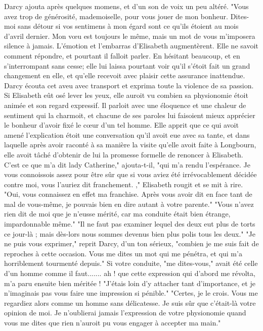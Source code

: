 Darcy ajouta après quelques momens, et d'un son de voix un peu altéré. "Vous avez trop de générosité, mademoiselle, pour vous jouer de mon bonheur. Dites-moi sans détour si vos sentimens à mon égard sont ce qu'ils étoient au mois d'avril dernier. Mon vœu est toujours le même, mais un mot\setcounter{page}{263} de vous m'imposera silence à jamais. L'émotion et l'embarras d'Elisabeth augmentèrent. Elle ne savoit comment répondre, et pourtant il falloit parler. En hésitant beaucoup, et en s'interrompant sans cesse; elle lui laissa pourtant voir qu'il s'étoit fait un grand changement en elle, et qu'elle recevoit avec plaisir cette assurance inattendue.
Darcy écouta cet aveu avec transport et exprima toute la violence de sa passion. Si Elisabeth eût osé lever les yeux, elle auroit vu combien sa physionomie étoit animée et son regard expressif. Il parloit avec une éloquence et une chaleur de sentiment qui la charmoit, et chacune de ses paroles lui faisoient mieux apprécier le bonheur d'avoir fixé le cœur d'un tel homme.
Elle apprit que ce qui avoit amené l'explication étoit une conversation qu'il avoit eue avec sa tante, et dans laquelle après avoir raconté à sa manière la visite qu'elle avoit faite à Longbourn, elle avoit tâché d'obtenir de lui la promesse formelle de renoncer à Elisabeth. C'est ce que m'a dit lady Catherine," ajouta-t-il, "qui m'a rendu l'espérance. Je vous connoissois assez pour être sûr que si vous aviez été irrévocablement décidée contre moi, vous l'auriez dit franchement. ,"
\setcounter{page}{264}
Elisabeth rougit et se mit à rire. "Oui, vous connaissez en effet ma franchise. Après vous avoir dit en face tant de mal de vous-même, je pouvais bien en dire autant à votre parente."
"Vous n'avez rien dit de moi que je n'eusse mérité, car ma conduite était bien étrange, impardonnable même."
"Il ne faut pas examiner lequel des deux eut plus de torts ce jour-là ; mais dès-lors nous sommes devenus bien plus polis tous les deux."
"Je ne puis vous exprimer," reprit Darcy, d'un ton sérieux, "combien je me suis fait de reproches à cette occasion. Vous me dites un mot qui me pénétra, et qui m'a horriblement tourmenté depuis." Si votre conduite, "me dites-vous," avait été celle d'un homme comme il faut....... ah ! que cette expression qui d'abord me révolta, m'a paru ensuite bien méritée !
"J'étais loin d'y attacher tant d'importance, et je n'imaginais pas vous faire une impression si pénible."
"Certes, je le crois. Vous me regardiez alors comme un homme sans délicatesse. Je suis sûr que c'était-là votre opinion de moi. Je n'oublierai jamais l'expression de votre physionomie quand vous me dites que rien\setcounter{page}{265} n'auroit pu vous engager à accepter ma main."
